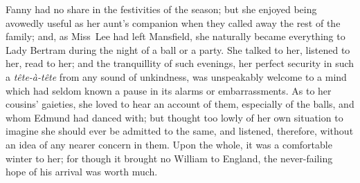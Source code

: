 Fanny had no share in the festivities of the season; but she enjoyed being avowedly useful as her aunt's companion when they called away the rest of the family; and, as Miss~Lee had left Mansfield, she naturally became everything to Lady Bertram during the night of a ball or a party. She talked to her, listened to her, read to her; and the tranquillity of such evenings, her perfect security in such a \textit{tête-à-tête}  from any sound of unkindness, was unspeakably welcome to a mind which had seldom known a pause in its alarms or embarrassments. As to her cousins' gaieties, she loved to hear an account of them, especially of the balls, and whom Edmund had danced with; but thought too lowly of her own situation to imagine she should ever be admitted to the same, and listened, therefore, without an idea of any nearer concern in them. Upon the whole, it was a comfortable winter to her; for though it brought no William to England, the never-failing hope of his arrival was worth much.

